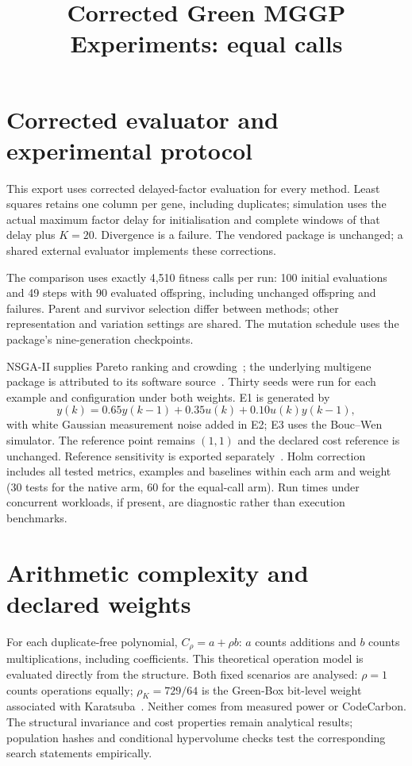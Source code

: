 \documentclass[11pt,a4paper]{article}
\theoremstyle{definition}
\theoremstyle{plain}
\theoremstyle{remark}
\begin{document}
\title{Corrected Green MGGP Experiments: equal calls}
\author{}\date{}\maketitle

\section{Corrected evaluator and experimental protocol}
\noindent This export uses corrected delayed-factor evaluation for every method. Least squares retains one column per gene, including duplicates; simulation uses the actual maximum factor delay for initialisation and complete windows of that delay plus $K=20$. Divergence is a failure. The vendored package is unchanged; a shared external evaluator implements these corrections.

The comparison uses exactly 4,510 fitness calls per run: 100 initial evaluations and 49 steps with 90 evaluated offspring, including unchanged offspring and failures. Parent and survivor selection differ between methods; other representation and variation settings are shared. The mutation schedule uses the package's nine-generation checkpoints.

NSGA-II supplies Pareto ranking and crowding~\cite{DPAM2002}; the underlying multigene package is attributed to its software source~\cite{mggpy}. Thirty seeds were run for each example and configuration under both weights. E1 is generated by
\begin{equation}y(k)=0.65y(k-1)+0.35u(k)+0.10u(k)y(k-1),\label{eq:tutorial}\end{equation}
with white Gaussian measurement noise added in E2; E3 uses the Bouc--Wen simulator. The reference point remains $(1,1)$ and the declared cost reference is unchanged. Reference sensitivity is exported separately~\cite{Ishibuchi2018}. Holm correction includes all tested metrics, examples and baselines within each arm and weight (30 tests for the native arm, 60 for the equal-call arm). Run times under concurrent workloads, if present, are diagnostic rather than execution benchmarks.

\section{Arithmetic complexity and declared weights}
For each duplicate-free polynomial, $C_\rho=a+\rho b$: $a$ counts additions and $b$ counts multiplications, including coefficients. This theoretical operation model is evaluated directly from the structure. Both fixed scenarios are analysed: $\rho=1$ counts operations equally; $\rho_K=729/64$ is the Green-Box bit-level weight associated with Karatsuba~\cite{NMN2023,KO1963}. Neither comes from measured power or CodeCarbon. The structural invariance and cost properties remain analytical results; population hashes and conditional hypervolume checks test the corresponding search statements empirically.
\end{document}
